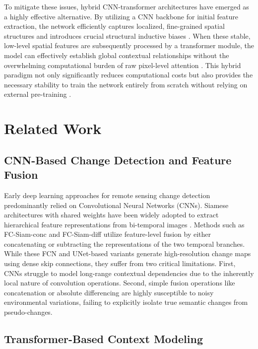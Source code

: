 \documentclass[conference]{IEEEtran}
\begin{document}
To mitigate these issues, hybrid CNN-transformer architectures have emerged as a highly effective alternative. By utilizing a CNN backbone for initial feature extraction, the network efficiently captures localized, fine-grained spatial structures and introduces crucial structural inductive biases \cite{bit2021, scratchformer2024}. When these stable, low-level spatial features are subsequently processed by a transformer module, the model can effectively establish global contextual relationships without the overwhelming computational burden of raw pixel-level attention \cite{bit2021}. This hybrid paradigm not only significantly reduces computational costs but also provides the necessary stability to train the network entirely from scratch without relying on external pre-training \cite{scratchformer2024}.


\section{Related Work}

\subsection{CNN-Based Change Detection and Feature Fusion}

Early deep learning approaches for remote sensing change detection predominantly relied on Convolutional Neural Networks (CNNs). Siamese architectures with shared weights have been widely adopted to extract hierarchical feature representations from bi-temporal images \cite{daudt2018fully}. Methods such as FC-Siam-conc and FC-Siam-diff \cite{daudt2018fully} utilize feature-level fusion by either concatenating or subtracting the representations of the two temporal branches. While these FCN and UNet-based variants generate high-resolution change maps using dense skip connections, they suffer from two critical limitations. First, CNNs struggle to model long-range contextual dependencies due to the inherently local nature of convolution operations. Second, simple fusion operations like concatenation or absolute differencing are highly susceptible to noisy environmental variations, failing to explicitly isolate true semantic changes from pseudo-changes.

\subsection{Transformer-Based Context Modeling}
\end{document}
